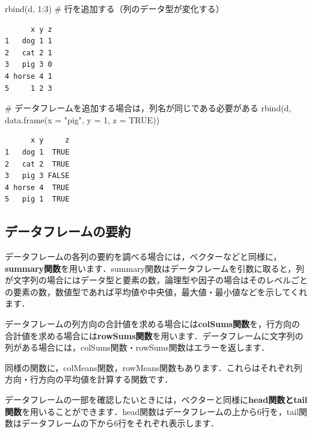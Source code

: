 \documentclass[
  letterpaper,
  DIV=11,
  numbers=noendperiod]{scrreprt}
\newenvironment{Shaded}{\begin{snugshade}}{\end{snugshade}}
\newcommand{\AttributeTok}[1]{\textcolor[rgb]{0.40,0.45,0.13}{#1}}
\newcommand{\CommentTok}[1]{\textcolor[rgb]{0.37,0.37,0.37}{#1}}
\newcommand{\ConstantTok}[1]{\textcolor[rgb]{0.56,0.35,0.01}{#1}}
\newcommand{\DecValTok}[1]{\textcolor[rgb]{0.68,0.00,0.00}{#1}}
\newcommand{\FunctionTok}[1]{\textcolor[rgb]{0.28,0.35,0.67}{#1}}
\newcommand{\NormalTok}[1]{\textcolor[rgb]{0.00,0.23,0.31}{#1}}
\newcommand{\SpecialCharTok}[1]{\textcolor[rgb]{0.37,0.37,0.37}{#1}}
\newcommand{\StringTok}[1]{\textcolor[rgb]{0.13,0.47,0.30}{#1}}
\begin{document}
\begin{Shaded}
\begin{Highlighting}[]
\FunctionTok{rbind}\NormalTok{(d, }\DecValTok{1}\SpecialCharTok{:}\DecValTok{3}\NormalTok{) }\CommentTok{\# 行を追加する（列のデータ型が変化する）}
\end{Highlighting}
\end{Shaded}

\begin{verbatim}
      x y z
1   dog 1 1
2   cat 2 1
3   pig 3 0
4 horse 4 1
5     1 2 3
\end{verbatim}

\begin{Shaded}
\begin{Highlighting}[]
\CommentTok{\# データフレームを追加する場合は，列名が同じである必要がある}
\FunctionTok{rbind}\NormalTok{(d, }\FunctionTok{data.frame}\NormalTok{(}\AttributeTok{x =} \StringTok{"pig"}\NormalTok{, }\AttributeTok{y =} \DecValTok{1}\NormalTok{, }\AttributeTok{z =} \ConstantTok{TRUE}\NormalTok{)) }
\end{Highlighting}
\end{Shaded}

\begin{verbatim}
      x y     z
1   dog 1  TRUE
2   cat 2  TRUE
3   pig 3 FALSE
4 horse 4  TRUE
5   pig 1  TRUE
\end{verbatim}

\hypertarget{ux30c7ux30fcux30bfux30d5ux30ecux30fcux30e0ux306eux8981ux7d04}{%
\subsection{データフレームの要約}\label{ux30c7ux30fcux30bfux30d5ux30ecux30fcux30e0ux306eux8981ux7d04}}

データフレームの各列の要約を調べる場合には，ベクターなどと同様に，\textbf{summary関数}を用います．summary関数はデータフレームを引数に取ると，列が文字列の場合にはデータ型と要素の数，論理型や因子の場合はそのレベルごとの要素の数，数値型であれば平均値や中央値，最大値・最小値などを示してくれます．

データフレームの列方向の合計値を求める場合には\textbf{colSums関数}を，行方向の合計値を求める場合には\textbf{rowSums関数}を用います．データフレームに文字列の列がある場合には，colSums関数・rowSums関数はエラーを返します．

同様の関数に，colMeans関数，rowMeans関数もあります．これらはそれぞれ列方向・行方向の平均値を計算する関数です．

データフレームの一部を確認したいときには，ベクターと同様に\textbf{head関数とtail関数}を用いることができます．head関数はデータフレームの上から6行を，tail関数はデータフレームの下から6行をそれぞれ表示します．
\end{document}
